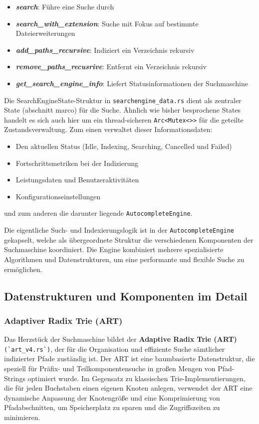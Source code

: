 \begin{itemize} 
  \item \textbf{\textit{search}}: Führe eine Suche durch 

  \item \textbf{\textit{search\_with\_extension}}: Suche mit Fokus auf bestimmte Dateierweiterungen 

  \item \textbf{\textit{add\_paths\_recursive}}: Indiziert ein Verzeichnis rekursiv 

  \item \textbf{\textit{remove\_paths\_recusrive}}: Entfernt ein Verzeichnis rekursiv 

  \item \textbf{\textit{get\_search\_engine\_info}}: Liefert Statusinformationen der Suchmaschine 
\end{itemize}

Die SearchEngineState-Struktur in \verb|searchengine_data.rs| dient als zentraler State (abschnitt marco) für die Suche. Ähnlich
wie bisher besprochene States handelt es sich auch hier um ein thread-sicheren \verb|Arc<Mutex<>>| für die geteilte
Zustandsverwaltung. Zum einen verwaltet dieser Informationsdaten:

\begin{itemize}
	\item Den aktuellen Status (Idle, Indexing, Searching, Cancelled und Failed)
	\item Fortschrittsmetriken bei der Indizierung
	\item Leistungsdaten und Benutzeraktivitäten
	\item Konfigurationseinstellungen
\end{itemize}
und zum anderen die darunter liegende \verb|AutocompleteEngine|.

Die eigentliche Such- und Indexierungslogik ist in der \verb|AutocompleteEngine| gekapselt, welche als übergeordnete Struktur die
verschiedenen Komponenten der Suchmaschine koordiniert. Die Engine kombiniert mehrere spezialisierte Algorithmen und
Datenstrukturen, um eine performante und flexible Suche zu ermöglichen.

\subsection{Datenstrukturen und Komponenten im Detail}

\subsubsection{Adaptiver Radix Trie (ART)} Das Herzstück der Suchmaschine bildet der \textbf{Adaptive Radix Trie (ART)}
\verb|(`art_v4.rs`)|, der für die Organisation und effiziente Suche sämtlicher indizierter Pfade zuständig ist. Der ART ist eine
baumbasierte Datenstruktur, die speziell für Präfix- und Teilkomponentensuche in großen Mengen von Pfad-Strings optimiert wurde.
Im Gegensatz zu klassischen Trie-Implementierungen, die für jeden Buchstaben einen eigenen Knoten anlegen, verwendet der ART eine
dynamische Anpassung der Knotengröße und eine Komprimierung von Pfadabschnitten, um Speicherplatz zu sparen und die Zugriffszeiten
zu minimieren.

